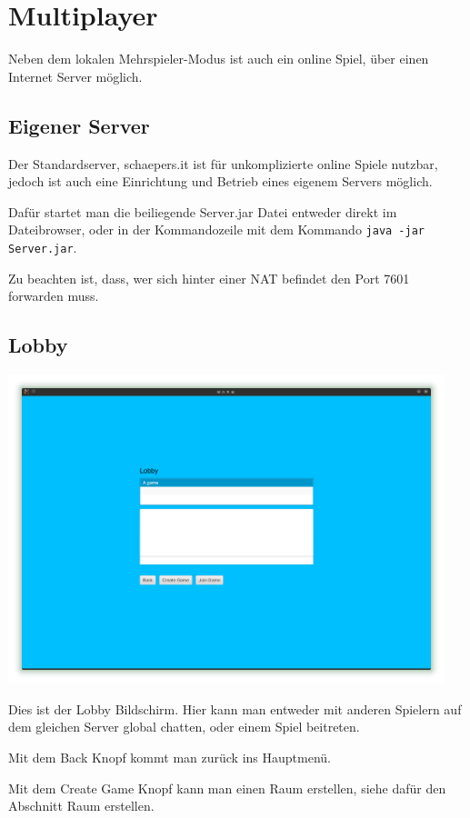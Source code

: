 \documentclass{scrreprt}
\begin{document}
\chapter{Multiplayer}

Neben dem lokalen Mehrspieler-Modus ist auch ein online Spiel, über einen Internet Server möglich.

\section{Eigener Server}

Der Standardserver, schaepers.it ist für unkomplizierte online Spiele nutzbar, jedoch ist auch eine Einrichtung und Betrieb eines
eigenem Servers möglich.

Dafür startet man die beiliegende Server.jar Datei entweder direkt im Dateibrowser, oder in der Kommandozeile mit dem Kommando
\texttt{java -jar Server.jar}.

Zu beachten ist, dass, wer sich hinter einer NAT befindet den Port 7601 forwarden muss.

\section{Lobby}

\includegraphics[height=9cm]{Screenshot8.png}

Dies ist der Lobby Bildschirm. Hier kann man entweder mit anderen Spielern auf dem gleichen Server global chatten, oder einem
Spiel beitreten.

Mit dem Back Knopf kommt man zurück ins Hauptmenü.

Mit dem Create Game Knopf kann man einen Raum erstellen, siehe dafür den Abschnitt Raum erstellen.
\end{document}
